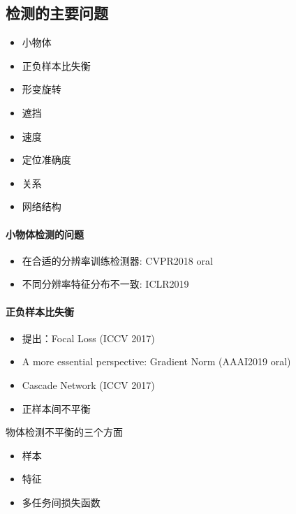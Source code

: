 \documentclass[UTF8, a4paper]{ctexart}
\begin{document}
\subsection{检测的主要问题}

\begin{itemize}
    \item 小物体
    \item 正负样本比失衡
    \item 形变旋转
    \item 遮挡
    \item 速度
    \item 定位准确度
    \item 关系
    \item 网络结构
\end{itemize}

\paragraph{小物体检测的问题} 
\begin{itemize}
    \item 在合适的分辨率训练检测器\cite{snip_Singh_2018_CVPR}: CVPR2018 oral
    \item 不同分辨率特征分布不一致\cite{feature_interwiners_li2018feature}: ICLR2019
\end{itemize}

\paragraph{正负样本比失衡}
\begin{itemize}
    \item 提出：Focal Loss\cite{Focal_Loss_Lin_2017_ICCV} (ICCV 2017)
    \item A more essential perspective: Gradient Norm\cite{gradient_harm_Li2019GradientHS} (AAAI2019 oral)
    \item Cascade Network\cite{cascade_net_Ouyang_2017_ICCV, cascade_rcnn_Cai_2018_CVPR} (ICCV 2017)
    \item 正样本间不平衡\cite{long_tail_distr_Ouyang_2016_CVPR}
\end{itemize}

物体检测不平衡的三个方面\cite{libra_rcnn_Pang_2019_CVPR}
\begin{itemize}
    \item 样本
    \item 特征
    \item 多任务间损失函数
\end{itemize}
\end{document}
